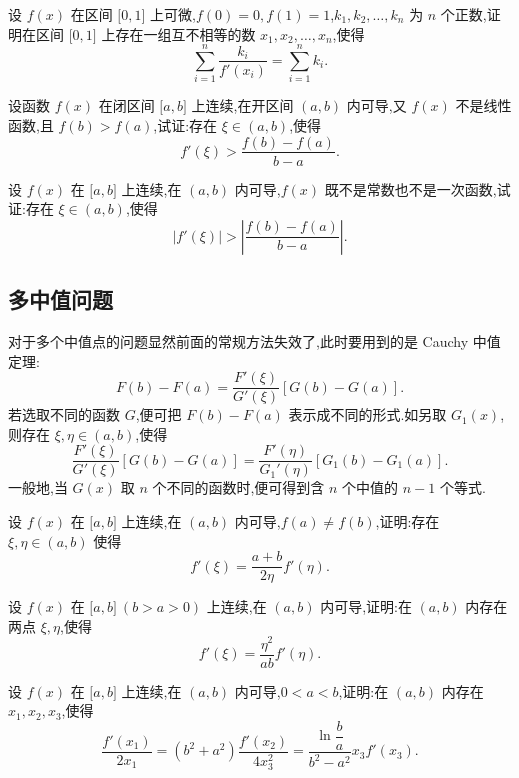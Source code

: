 \documentclass[../数学分析培优讲义.tex]{subfiles}
\begin{document}
\begin{example}
设 $f(x)$ 在区间 $\lbrack 0,1\rbrack$ 上可微,$f(0)=0,f(1)=1$,$k_1,k_2,\ldots,k_n$ 为 $n$ 个正数,证明在区间 $\lbrack 0,1\rbrack$ 上存在一组互不相等的数 $x_1,x_2,\ldots,x_n$,使得
\[
    \sum\limits_{i=1}^n\dfrac{k_i}{f'(x_i)}
    =\sum\limits_{i=1}^n k_i.
\]
\end{example}
\exampleblank

\begin{example}
设函数 $f(x)$ 在闭区间 $\lbrack a,b\rbrack$ 上连续,在开区间 $(a,b)$ 内可导,又 $f(x)$ 不是线性函数,且 $f(b)>f(a)$,试证:存在 $\xi\in(a,b)$,使得
\[
    f'(\xi)>\dfrac{f(b)-f(a)}{b-a}.
\]
\end{example}
\exampleblank

\begin{example}
设 $f(x)$ 在 $\lbrack a,b\rbrack$ 上连续,在 $(a,b)$ 内可导,$f(x)$ 既不是常数也不是一次函数,试证:存在 $\xi\in(a,b)$,使得
\[
    |f'(\xi)|>\left|\dfrac{f(b)-f(a)}{b-a}\right|.
\]
\end{example}
\exampleblank


\newpage

\subsection{多中值问题}

对于多个中值点的问题显然前面的常规方法失效了,此时要用到的是 Cauchy 中值定理:
\[
    F(b)-F(a)=\dfrac{F'(\xi)}{G'(\xi)}[G(b)-G(a)].
\]
若选取不同的函数 $G$,便可把 $F(b)-F(a)$ 表示成不同的形式.如另取 $G_1(x)$,则存在 $\xi,\eta\in(a,b)$,使得
\[
    \dfrac{F'(\xi)}{G'(\xi)}[G(b)-G(a)]
    =\dfrac{F'(\eta)}{G_1'(\eta)}[G_1(b)-G_1(a)].
\]
一般地,当 $G(x)$ 取 $n$ 个不同的函数时,便可得到含 $n$ 个中值的 $n-1$ 个等式.

\begin{example}
设 $f(x)$ 在 $\lbrack a,b\rbrack$ 上连续,在 $(a,b)$ 内可导,$f(a)\neq f(b)$,证明:存在 $\xi,\eta\in(a,b)$ 使得
\[
    f'(\xi)=\dfrac{a+b}{2\eta}f'(\eta).
\]
\end{example}
\exampleblank

\begin{example}
设 $f(x)$ 在 $\lbrack a,b\rbrack\ (b>a>0)$ 上连续,在 $(a,b)$ 内可导,证明:在 $(a,b)$ 内存在两点 $\xi,\eta$,使得
\[
    f'(\xi)=\dfrac{\eta^2}{ab}f'(\eta).
\]
\end{example}
\exampleblank

\begin{example}
设 $f(x)$ 在 $\lbrack a,b\rbrack$ 上连续,在 $(a,b)$ 内可导,$0<a<b$,证明:在 $(a,b)$ 内存在 $x_1,x_2,x_3$,使得
\[
    \dfrac{f'(x_1)}{2x_1}
    =(b^2+a^2)\dfrac{f'(x_2)}{4x_3^2}
    =\dfrac{\ln\dfrac{b}{a}}{b^2-a^2}x_3f'(x_3).
\]
\end{example}
\exampleblank
\end{document}
